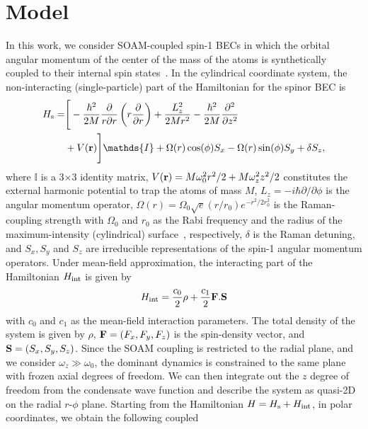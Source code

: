 \documentclass[pra,twocolumn,aps,superscriptaddress,showpacs,longbibliography]{revtex4-1}
\begin{document}
\section{Model}
\label{Sec-II}
In this work, we consider SOAM-coupled 
spin-1 BECs in which the orbital angular momentum of the center of the mass of the atoms is synthetically coupled to their internal spin 
states~\cite{chen2018spin,zhang2019ground}. In the cylindrical coordinate system, the non-interacting (single-particle) part 
of the Hamiltonian for the spinor BEC is~\cite{chen2018spin,chen2018rotating}
\begin{align}
\label{single_pa}
H_{\rm s}=&\Bigg[-\frac{\hbar^2}{2M}\frac{\partial}{r \partial r}
        \left(r\frac{\partial}{\partial r}\right)+
        \frac{L_z^2}{2M r^2}-\frac{\hbar^2}{2M}
        \frac{\partial^2}{\partial z^2}\\
       & + V({\bf r})\Bigg]\mathds{I} 
+ {\Omega(r) \cos(\phi) S_x-\Omega(r)\sin(\phi)S_y+\delta S_z},\nonumber
\end{align}
where $\mathds{I}$ is a 3$\times$3 identity matrix, $V({\bf r}) = M \omega_0^2 r^2/2+M\omega_z^2 z^2/2$ constitutes the external harmonic 
potential to trap the atoms of mass $M$, $L_z=-i \hbar \partial/\partial\phi$ is the angular momentum operator,
$\Omega(r) = \Omega_0 \sqrt{e}(r/r_0)e^{-r^2/2 r_0^2}$ is the Raman-coupling strength 
with $\Omega_0$ and $r_0$ as the Rabi frequency and the radius of the maximum-intensity (cylindrical) surface~\cite{chen2018spin,chen2018rotating}, respectively,
$\delta$ is the Raman detuning, and $S_x, S_y$ and $S_z$ are irreducible representations of the spin-1 angular momentum 
operators. Under mean-field approximation, the interacting part of the  Hamiltonian $H_{\rm int}$
is given by \cite{kawaguchi2012spinor}
{\begin{equation}
H_{\rm int} = \frac{c_0}{2} \rho+
\frac{c_1}{2} {\bf F}.{\bf S}
\label{int_h}
\end{equation}}
with $c_0$ and $c_1$ as the mean-field interaction parameters.
The total density of the system is given by $\rho$, ${\bf F} = (F_x, F_y, F_z)$ is the spin-density vector{\color{black}, and ${\bf S}=(S_x,S_y,S_z)$}.
Since the SOAM coupling is restricted to the radial plane, 
and we consider $\omega_z \gg \omega_0$, the dominant dynamics is constrained to the same plane with frozen axial degrees of freedom.
We can then integrate out the $z$ degree of freedom from the condensate wave function 
and describe the system as quasi-2D on the radial $r$-$\phi$ plane. 
Starting from the Hamiltonian $H=H_{\rm s} + H_{\rm int}$, in polar coordinates, we obtain the following coupled 
\end{document}

